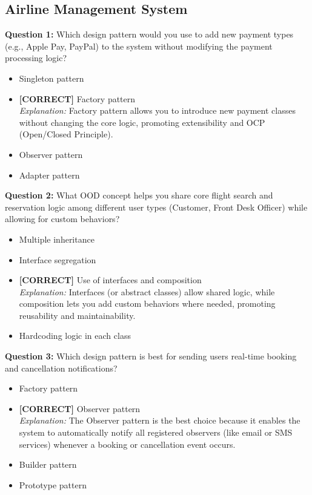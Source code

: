 \subsection*{Airline Management System}
\vspace{0.3cm}
\noindent
\textbf{Question 1:} Which design pattern would you use to add new payment types (e.g., Apple Pay, PayPal) to the system without modifying the payment processing logic?
\\[0.2cm]
\begin{itemize}
 \item Singleton pattern
 \item \textbf{[CORRECT]} Factory pattern
\\[0.1cm]
\textit{Explanation:} 
Factory pattern allows you to introduce new payment classes without changing the core logic, promoting extensibility and OCP (Open/Closed Principle).
 \item Observer pattern
 \item Adapter pattern
\end{itemize}
\vspace{0.3cm}
\noindent
\textbf{Question 2:} What OOD concept helps you share core flight search and reservation logic among different user types (Customer, Front Desk Officer) while allowing for custom behaviors?
\\[0.2cm]
\begin{itemize}
 \item Multiple inheritance
 \item Interface segregation
 \item \textbf{[CORRECT]} Use of interfaces and composition
\\[0.1cm]
\textit{Explanation:} 
Interfaces (or abstract classes) allow shared logic, while composition lets you add custom behaviors where needed, promoting reusability and maintainability.
 \item Hardcoding logic in each class
\end{itemize}
\vspace{0.3cm}
\noindent
\textbf{Question 3:} Which design pattern is best for sending users real-time booking and cancellation notifications?
\\[0.2cm]
\begin{itemize}
 \item Factory pattern
 \item \textbf{[CORRECT]} Observer pattern
\\[0.1cm]
\textit{Explanation:} 
The Observer pattern is the best choice because it enables the system to automatically notify all registered observers (like email or SMS services) whenever a booking or cancellation event occurs.
 \item Builder pattern
 \item Prototype pattern
\end{itemize}
